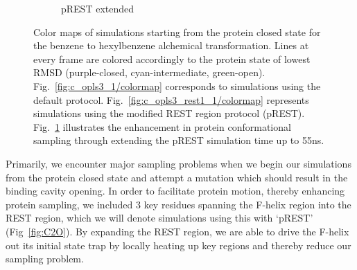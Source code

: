 \begin{figure}[H]
\begin{subfigure}{.5\textwidth}
\end{subfigure}\hfill
\centering
\begin{subfigure}{\textwidth}
   \centering
   \caption{pREST extended}
   \label{fig:c_opls3_rest1_1/cmap-45-55ns}
\end{subfigure}\hfill
\caption{Color maps of simulations starting from the protein closed state for the benzene to hexylbenzene alchemical transformation.
Lines at every frame are colored accordingly to the protein state of lowest RMSD (purple-closed, cyan-intermediate, green-open).
Fig.~\ref{fig:c_opls3_1/colormap} corresponds to simulations using the default protocol. Fig.~\ref{fig:c_opls3_rest1_1/colormap} represents simulations using the modified REST region protocol (pREST). Fig.~\ref{fig:c_opls3_rest1_1/cmap-45-55ns} illustrates the enhancement in protein conformational sampling through extending the pREST simulation time up to 55ns.
}
\label{fig:benzene_to_n-hexyl_colormap}
\end{figure}

Primarily, we encounter major sampling problems when we begin our simulations from the protein closed state and attempt a mutation which should result in the binding cavity opening.
In order to facilitate protein motion, thereby enhancing protein sampling, we included 3 key residues spanning the F-helix region into the REST region, which we will denote simulations using this with `pREST' (Fig~\ref{fig:C2O}).
By expanding the REST region, we are able to drive the F-helix out its initial state trap by locally heating up key regions and thereby reduce our sampling problem.

